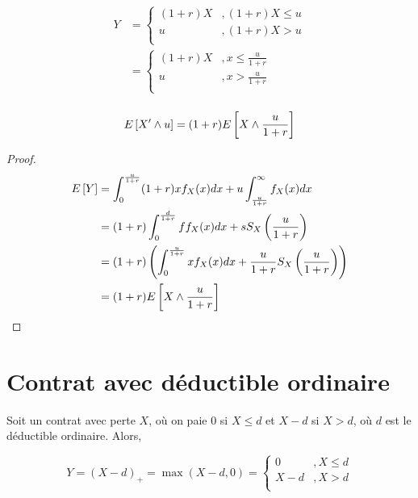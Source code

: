 \documentclass[12pt, french]{report}
\begin{document}
\begin{align*}
Y & = 
\begin{cases}
(1+r) X	&, (1+r)X \leq u \\
u		&, (1+r) X > u \\
\end{cases} \\
	& = 
\begin{cases}
(1+r)X	&, x \leq \frac{u}{1+r} \\
u		&, x > \frac{u}{1+r} \\
\end{cases} \\
\end{align*}
\begin{definition}
\begin{equation}
E \left[ X' \wedge u \right] = (1+r) E \left[ X  \wedge \frac{u}{1+r} \right] 
\end{equation}
\end{definition}

\begin{proof}
\begin{align*}
E \left[ Y \right]	& = \int_{0}^{\frac{u}{1+r}} (1+r) x f_X(x) dx  + u \int_{\frac{u}{1+r}}^{\infty} f_X(x) dx \\
	& = (1+r) \int_{0}^{\frac{d}{1+r}} f f_X(x) dx + s S_X \left( \frac{u}{1+r} \right) \\
	& = (1+r) \left( \int_{0}^{\frac{u}{1+r}} x f_X(x) dx  + \frac{u}{1+r} S_X \left( \frac{u}{1+r} \right)    \right)	 \\
	& = (1+r) E \left[ X  \wedge \frac{u}{1+r} \right]  \\
\end{align*}
\end{proof}





\section{Contrat avec déductible ordinaire}
Soit un contrat avec perte $X$, où on paie 0 si $X \leq d$ et $X-d$ si $X > d$, où $d$ est le déductible ordinaire. Alors,

\begin{equation}
Y = (X-d)_+ = \max(X-d,0) = 
\begin{cases}
0		& , X \leq d \\
X - d	& , X > d \\
\end{cases}
\end{equation}
\end{document}
